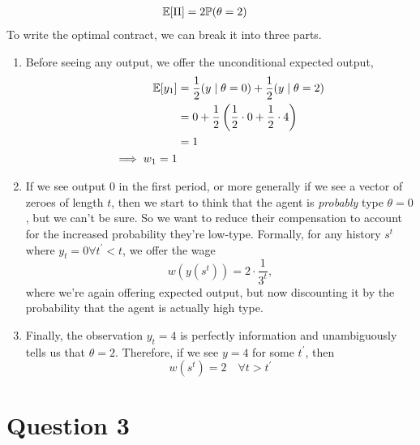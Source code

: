 \begin{enumerate}[label=\alph*)]
\begin{align*}
    \mathbb{E}[\Pi] &= 2 \mathbb{P} (\theta = 2)
  \end{align*}
  To write the optimal contract, we can break it into three parts.
\begin{enumerate}
  \item
  Before seeing any output, we offer the unconditional expected output,
  \begin{align*}
    \mathbb{E}[y_1] &= \frac{1}{2}(y \mid \theta = 0) + \frac{1}{2} (y \mid \theta = 2)\\
            &= 0 + \frac{1}{2} \left(\frac{1}{2} \cdot 0 + \frac{1}{2} \cdot 4\right)\\
            &= 1\\
    \implies w_1 = 1
  \end{align*}
\item If we see output $0$ in the first period, or more generally if we see a vector of zeroes of length $t$, then we start to think that the agent is \emph{probably} type $\theta = 0$, but we can't be sure. So we want to reduce their compensation to account for the increased probability they're low-type. Formally, for any history $s^t$ where $y_t = 0 \forall  t^\prime < t$, we offer the wage
  \[
w(y(s^t)) = 2 \cdot \frac{1}{3^t},
\]
where we're again offering expected output, but now discounting it by the probability that the agent is actually high type.
\item Finally, the observation $y_t = 4$ is perfectly information and unambiguously tells us that $\theta =2$. Therefore, if we see $y = 4$ for some $t^\prime$, then
  \[
w(s^t) = 2 \quad \forall t > t^\prime
  \]
  \end{enumerate}
\end{enumerate}
\section{Question 3}
